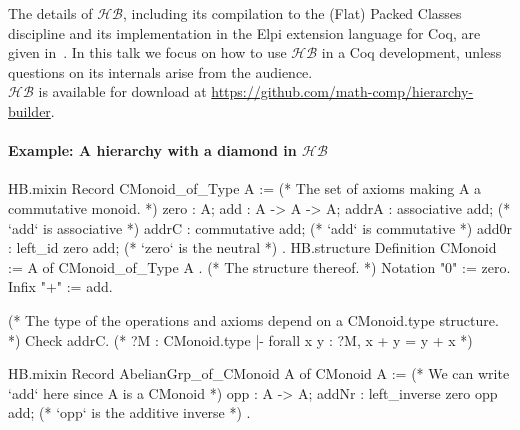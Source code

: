 \documentclass{easychair}
\newcommand{\HB}{\ensuremath{\mathcal{HB}}}
\begin{document}
The details of \HB{}, including its compilation to the (Flat) Packed Classes
discipline and its implementation in the Elpi extension language for Coq,
are given in~\cite{cohen:hal-02478907}.
In this talk we focus on how to use \HB{} in a Coq development,
unless questions on its internals arise from the audience.\\
\HB{} is available for download at \url{https://github.com/math-comp/hierarchy-builder}.

\paragraph{Example: A hierarchy with a diamond in \HB{}}

\begin{coqcode}
HB.mixin Record CMonoid_of_Type A := { (* The set of axioms making A a commutative monoid. *)
  zero  : A;
  add   : A -> A -> A;
  addrA : associative add;  (* `add` is associative  *)
  addrC : commutative add;  (* `add` is commutative  *)
  add0r : left_id zero add; (* `zero` is the neutral *)
}.
HB.structure Definition CMonoid := { A of CMonoid_of_Type A }. (* The structure thereof. *)
Notation "0" := zero.
Infix    "+" := add.

(* The type of the operations and axioms depend on a CMonoid.type structure. *)
Check addrC. (* ?M : CMonoid.type |- forall x y : ?M, x + y = y + x *)

HB.mixin Record AbelianGrp_of_CMonoid A of CMonoid A := {
  (* We can write `add` here since A is a  CMonoid   *)
  opp   : A -> A;
  addNr : left_inverse zero opp add; (* `opp` is the additive inverse *)
}.
\end{coqcode}

\newpage
\end{document}
